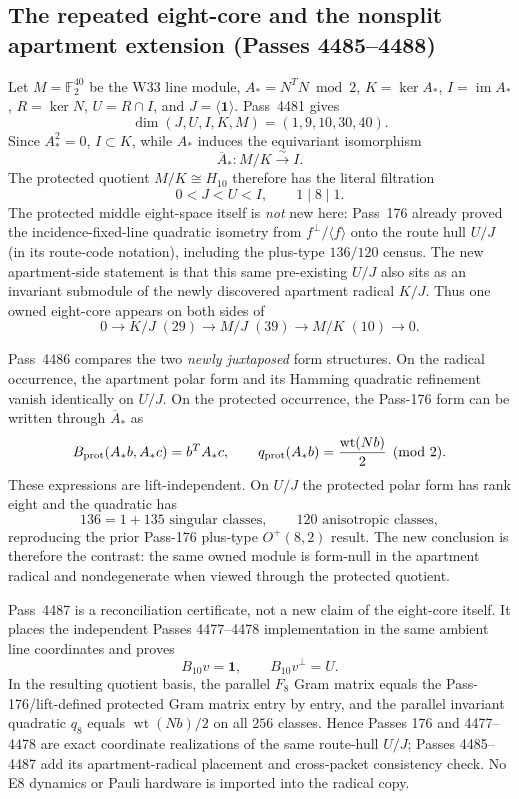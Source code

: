 \subsection{The repeated eight-core and the nonsplit apartment extension (Passes 4485--4488)}
\label{sec:pass4485-apartment-core-self-gluing}

Let $M=\mathbb F_2^{40}$ be the W33 line module, $A_*=N^TN\bmod2$,
$K=\ker A_*$, $I=\operatorname{im}A_*$, $R=\ker N$,
$U=R\cap I$, and $J=\langle\mathbf1\rangle$.  Pass~4481 gives
\[
 \dim(J,U,I,K,M)=(1,9,10,30,40).
\]
Since $A_*^2=0$, $I\subset K$, while $A_*$ induces the equivariant
isomorphism
\[
 \overline A_*:M/K\xrightarrow{\sim}I.
\]
The protected quotient $M/K\cong H_{10}$ therefore has the literal filtration
\[
 0<J<U<I,
 \qquad 1\mid8\mid1.
\]
The protected middle eight-space itself is \emph{not} new here: Pass~176
already proved the incidence-fixed-line quadratic isometry from
$f^\perp/\langle f\rangle$ onto the route hull $U/J$ (in its route-code
notation), including the plus-type $136/120$ census.  The new apartment-side
statement is that this same pre-existing $U/J$ also sits as an invariant
submodule of the newly discovered apartment radical $K/J$.  Thus one owned
eight-core appears on both sides of
\[
 0\to K/J\;(29)\to M/J\;(39)\to M/K\;(10)\to0.
\]

Pass~4486 compares the two \emph{newly juxtaposed} form structures.  On the
radical occurrence, the apartment polar form and its Hamming quadratic
refinement vanish identically on $U/J$.  On the protected occurrence, the
Pass-176 form can be written through $\overline A_*$ as
\[
 B_{\rm prot}(A_*b,A_*c)=b^TA_*c,
 \qquad
 q_{\rm prot}(A_*b)=\frac{\operatorname{wt}(Nb)}2\pmod2.
\]
These expressions are lift-independent.  On $U/J$ the protected polar form has
rank eight and the quadratic has
\[
 136=1+135\text{ singular classes},\qquad120\text{ anisotropic classes},
\]
reproducing the prior Pass-176 plus-type $O^+(8,2)$ result.  The new conclusion
is therefore the contrast: the same owned module is form-null in the apartment
radical and nondegenerate when viewed through the protected quotient.

Pass~4487 is a reconciliation certificate, not a new claim of the eight-core
itself.  It places the independent Passes 4477--4478 implementation in the same
ambient line coordinates and proves
\[
 \boxed{B_{10}v=\mathbf1,\qquad B_{10}v^\perp=U.}
\]
In the resulting quotient basis, the parallel $F_8$ Gram matrix equals the
Pass-176/lift-defined protected Gram matrix entry by entry, and the parallel
invariant quadratic $q_8$ equals $\operatorname{wt}(Nb)/2$ on all $256$
classes.  Hence Passes 176 and 4477--4478 are exact coordinate realizations of
the same route-hull $U/J$; Passes 4485--4487 add its apartment-radical
placement and cross-packet consistency check.  No E8 dynamics or Pauli hardware
is imported into the radical copy.

